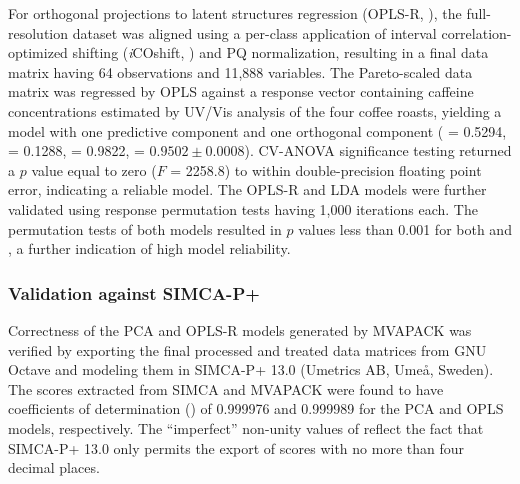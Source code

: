 \begin{doublespace}
For orthogonal projections to latent structures regression
(OPLS-R, \cite{trygg:jchemo2002}), the full-resolution dataset was aligned
using a per-class application of interval correlation-optimized shifting
(\emph{i}COshift, \cite{savorani:jmr2010}) and PQ normalization, resulting
in a final data matrix having 64 observations and 11,888 variables. The
Pareto-scaled data matrix was regressed by OPLS against a response vector
containing caffeine concentrations estimated by UV/Vis analysis of the four
coffee roasts, yielding a model with one predictive component and one
orthogonal component (\rsqxp{} = 0.5294, \rsqxo{} = 0.1288, \rsqy{} = 0.9822,
\qsq{} = $0.9502 \pm 0.0008$). CV-ANOVA significance testing returned a $p$
value equal to zero ($F$ = 2258.8) to within double-precision floating point
error, indicating a reliable model. The OPLS-R and LDA models were further
validated using response permutation tests having 1,000 iterations each. The
permutation tests of both models resulted in $p$ values less than 0.001 for
both \rsqy{} and \qsq{}, a further indication of high model reliability.
\end{doublespace}

\subsubsection{Validation against SIMCA-P+}

\begin{doublespace}
Correctness of the PCA and OPLS-R models generated by MVAPACK was verified by
exporting the final processed and treated data matrices from GNU Octave and
modeling them in SIMCA-P+ 13.0 (Umetrics AB, Ume\r{a}, Sweden). The scores
extracted from SIMCA and MVAPACK were found to have coefficients of
determination (\rsq{}) of 0.999976 and 0.999989 for the PCA and OPLS models,
respectively. The ``imperfect'' non-unity values of \rsq{} reflect the fact
that SIMCA-P+ 13.0 only permits the export of scores with no more than four
decimal places.
\end{doublespace}

